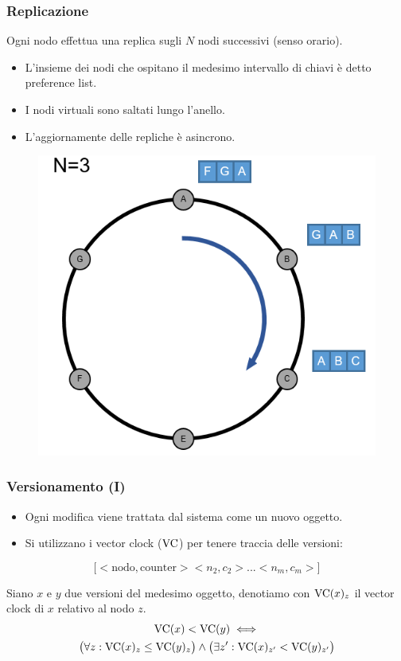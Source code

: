 \begin{frame}
  \frametitle{Replicazione}
  Ogni nodo effettua una replica sugli $N$ nodi successivi (senso orario).
  \begin{itemize}
  \item L'insieme dei nodi che ospitano il medesimo intervallo di chiavi è detto \alert{preference list}.
  \item I nodi virtuali sono saltati lungo l'anello.
  \item L'aggiornamente delle repliche è \alert{asincrono}.
  \end{itemize}
  \begin{figure}
  \centering
  \includegraphics[scale=0.3]{dynamo/replication.png}
  \end{figure}  
\end{frame}


\begin{frame}
  \frametitle{Versionamento (I)}
  \begin{itemize}
  \item Ogni modifica viene trattata dal sistema come un nuovo oggetto.
  \item Si utilizzano i \alert{vector clock} ($\mathrm{VC}$) per tenere traccia delle versioni:
  \end{itemize}
  \centering
    \[
    \big[<\mathrm{nodo}, \mathrm{counter}> <n_2, c_2> ... <n_m, c_m> \big]
    \]

  \begin{definizione}
    Siano $x$ e $y$ due versioni del medesimo oggetto, denotiamo con $\mathrm{VC}(x)_z$ il vector clock di $x$ relativo al nodo $z$.
    \begin{multline*}
    \mathrm{VC}(x) < \mathrm{VC}(y) \iff \\
      \big( \forall z \mathrel{:} \mathrm{VC}(x)_z \leq \mathrm{VC}(y)_z \big) \land \big( \exists z' \mathrel{:} \mathrm{VC}(x)_{z'} < \mathrm{VC}(y)_{z'} \big) 
    \end{multline*}
  \end{definizione}
\end{frame}


